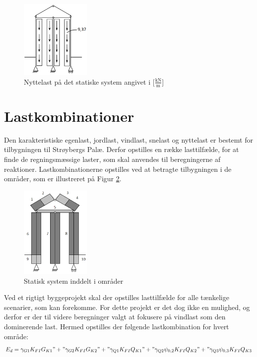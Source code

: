 \begin{figure}[htbp]
	\centering
	\includegraphics[width=0.3\textwidth]{billeder/nyttelast.png}
	\caption{Nyttelast på det statiske system angivet i [$\frac{\text{kN}}{\text{m}}$]}
	\label{fig:nyttelast}
\end{figure}

\section{Lastkombinationer}
Den karakteristiske egenlast, jordlast, vindlast, snelast og nyttelast er bestemt for tilbygningen til Strøybergs Palæ. Derfor opstilles en række lasttilfælde, for at finde de regningsmæssige laster, som skal anvendes til beregningerne af reaktioner. Lastkombinationerne opstilles ved at betragte tilbygningen i de områder, som er illustreret på Figur \ref{fig:omraader}.

\begin{figure}[H]
	\centering
	\includegraphics[width=0.3\textwidth]{billeder/indeling.png}
	\caption{Statisk system inddelt i områder}
	\label{fig:omraader}
\end{figure}

Ved et rigtigt byggeprojekt skal der opstilles lasttilfælde for alle tænkelige scenarier, som kan forekomme. For dette projekt er det dog ikke en mulighed, og derfor er der til videre beregninger valgt at fokusere på vindlast som den dominerende last. Hermed opstilles der følgende lastkombination for hvert område:
\begin{equation}
	E_d = \gamma_{G1} K_{FI} G_{K1}" + "\gamma_{G2} K_{FI} G_{K2}" + "\gamma_{Q1} K_{FI} Q_{K1}" + "\gamma_{Q2} \psi_{0,2} K_{FI} Q_{K2}" + "\gamma_{Q3} \psi_{0,3} K_{FI} Q_{K3}
\end{equation}

